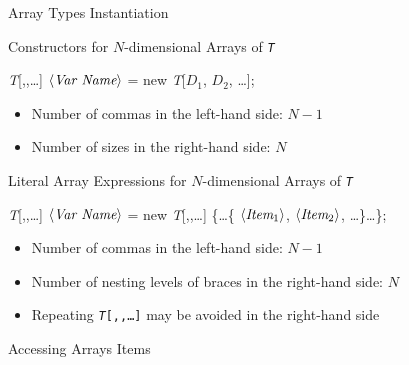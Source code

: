 \documentclass[presentation]{beamer}
\newcommand{\cscat}[1]{$\langle\text{{\itshape#1}}\rangle$}
\begin{document}
\begin{frame}[allowframebreaks]{Array Types Instantiation}
    \begin{block}{Constructors for $N$-dimensional Arrays of \texttt{\textit{T}}}
        \begin{center}\ttfamily
            \textit{T}[\alert{,,}\ldots{}] \cscat{Var Name} = \alert{new} \textit{T}[\alert{$D_1$}, \alert{$D_2$}, \ldots];
        \end{center}
        \begin{itemize}
            \item Number of commas in the left-hand side: $N-1$
            \item Number of sizes in the right-hand side: $N$
        \end{itemize}
    \end{block}
    \begin{block}{Literal Array Expressions for $N$-dimensional Arrays of \texttt{\textit{T}}}
        \begin{center}\ttfamily
            \textit{T}[\alert{,,}\ldots{}] \cscat{Var Name} = \alert{new} \textit{T}[\alert{,,}\ldots{}] 
                \alert{\{\ldots\{} \cscat{Item$_1$}, \cscat{Item$_2$}, \ldots  \alert{\}\ldots\}};
        \end{center}
        \begin{itemize}
            \item Number of commas in the left-hand side: $N-1$
            \item Number of nesting levels of braces in the right-hand side: $N$
            \item Repeating \texttt{\textit{T}[\alert{,,}\ldots{}]} may be avoided in the right-hand side
        \end{itemize}
    \end{block}

    \framebreak
    

\end{frame}

\begin{frame}[allowframebreaks]{Accessing Arrays Items}


\end{frame}
\end{document}
